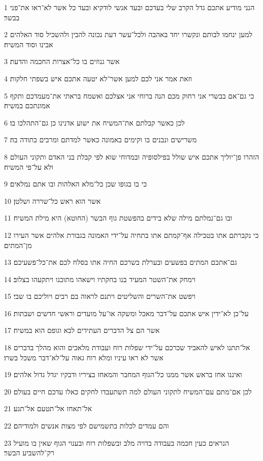 \par 1 הנני מודיע אתכם גדל הקרב שלי בעדכם ובעד אנשי לודקיא ובעד כל אשר לא־ראו את־פני בבשר׃
\par 2 למען ינחמו לבותם ונקשרו יחד באהבה ולכל־עשר דעת נכונה להבין ולהשכיל סוד האלהים אבינו וסוד המשיח׃
\par 3 אשר גנוזים בו כל־אצרות החכמה והדעת׃
\par 4 וזאת אמר אני לכם למען אשר־לא יטעה אתכם איש בשפתי חלקות׃
\par 5 כי גם־אם בבשרי אני רחוק מכם הנה ברוחי אני אצלכם ואשמח בראתי את־מעמדכם ותקף אמונתכם במשיח׃
\par 6 לכן כאשר קבלתם את־המשיח את ישוע אדנינו כן גם־התהלכו בו׃
\par 7 משרישים ונבנים בו וקימים באמונה כאשר למדתם ומרבים בתודה בה׃
\par 8 הזהרו פן־יוליך אתכם איש שולל בפילסופיה ובמדוחי שוא לפי קבלת בני האדם ותקוני העולם ולא על־פי המשיח׃
\par 9 כי בו בגופו שכן כל־מלא האלהות ובו אתם נמלאים׃
\par 10 אשר הוא ראש כל־שררה ושלטן׃
\par 11 ובו גם־נמלתם מילה שלא בידים בהפשטת גוף הבשר (החוטא) היא מילת המשיח׃
\par 12 כי נקברתם אתו בטבילה אף־קמתם אתו בתחיה על־ידי האמונה בגבורת אלהים אשר העירו מן־המתים׃
\par 13 גם־אתכם המתים בפשעים ובערלת בשרכם החיה אתו בסלח לכם את־כל־פשעיכם׃
\par 14 וימחק את־השטר המעיד בנו בחקתיו וישאהו מתוכנו ויתקעהו בצלוב׃
\par 15 ויפשט את־השרים והשליטים ויתנם לראוה בם רבים ויוליכם בו שבי׃
\par 16 על־כן לא־ידין איש אתכם על־דבר מאכל ומשקה או־על מועדים וראשי חדשים ושבתות׃
\par 17 אשר הם צל הדברים העתידים לבא וגופם הוא במשיח׃
\par 18 אל־תתנו לאיש להאביד שכרכם על־ידי שפלות רוח ועבודת מלאכים והוא מהלך בדברים אשר לא ראו עיניו ומלא רוח גאוה על־לא־דבר משכל בשרו׃
\par 19 ואיננו אחז בראש אשר ממנו כל־הגוף המחבר והמאחז בציריו ודבקיו יגדל גדול אלהים׃
\par 20 לכן אם־מתם עם־המשיח לתקוני העולם למה תשתעבדו לחקים כאלו עדכם חיים בעולם׃
\par 21 אל־תאחז אל־תטעם אל־תגע׃
\par 22 והם עמדים לכלות בתשמישם לפי מצות אנשים ולמודיהם׃
\par 23 הנראים כעין חכמה בעבודה בדויה מלב ובשפלות רוח ובענוי הגוף שאין בו מועיל רק־להשביע הבשר׃

